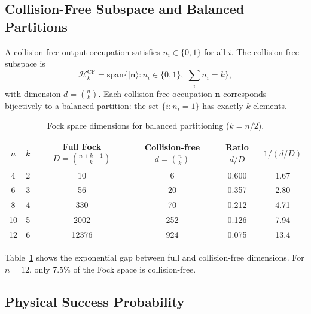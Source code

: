 \subsection{Collision-Free Subspace and Balanced Partitions}

A collision-free output occupation satisfies $n_i \in \{0,1\}$ for all $i$. The collision-free subspace is
\begin{equation}
\mathcal{H}_k^{\mathrm{CF}} = \mathrm{span}\{ |\mathbf{n}\rangle : n_i \in \{0,1\},\; \sum_i n_i = k \},
\end{equation}
with dimension $d = \binom{n}{k}$. Each collision-free occupation $\mathbf{n}$ corresponds bijectively to a balanced partition: the set $\{i : n_i = 1\}$ has exactly $k$ elements.

\begin{table}[ht]
\centering
\caption{Fock space dimensions for balanced partitioning ($k=n/2$).}
\label{tab:fock_dimensions}
\begin{tabular}{cccccc}
\toprule
$n$ & $k$ & Full Fock $D=\binom{n+k-1}{k}$ & Collision-free $d=\binom{n}{k}$ & Ratio $d/D$ & $1/(d/D)$ \\
\midrule
4 & 2 & 10 & 6 & 0.600 & 1.67 \\
6 & 3 & 56 & 20 & 0.357 & 2.80 \\
8 & 4 & 330 & 70 & 0.212 & 4.71 \\
10 & 5 & 2002 & 252 & 0.126 & 7.94 \\
12 & 6 & 12376 & 924 & 0.075 & 13.4 \\
\bottomrule
\end{tabular}
\end{table}

Table~\ref{tab:fock_dimensions} shows the exponential gap between full and collision-free dimensions. For $n=12$, only $7.5\%$ of the Fock space is collision-free.

\subsection{Physical Success Probability}


